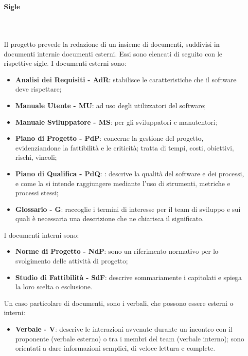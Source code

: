 		\paragraph{Sigle} \mbox{}\\ \mbox{}\\
		Il progetto prevede la redazione di un insieme di documenti, suddivisi in documenti interni\glosp e documenti esterni\glo. Essi sono elencati di seguito con le rispettive sigle.\newline
		I documenti esterni sono:	
		\begin{itemize}
			\item \textbf{Analisi dei Requisiti - AdR}: stabilisce le caratteristiche che il software deve rispettare;
			\item \textbf{Manuale Utente - MU}: ad uso degli utilizzatori del software;
			\item \textbf{Manuale Sviluppatore - MS}: per gli sviluppatori e manutentori;
			\item \textbf{Piano di Progetto - PdP}:  concerne la gestione del progetto, evidenziandone la fattibilità e le criticità; tratta di tempi, costi, obiettivi, rischi, vincoli;
			\item \textbf{Piano di Qualifica - PdQ}: : descrive la qualità del software e dei processi, e come la si intende raggiungere mediante l'uso di strumenti, metriche e processi stessi;
			\item \textbf{Glossario - G}: raccoglie i termini di interesse per il team di sviluppo e sui quali è necessaria una descrizione che ne chiarisca il significato.
		\end{itemize}
		I documenti interni sono:
		\begin{itemize}
			
			\item \textbf{Norme di Progetto - NdP}: sono un riferimento normativo per lo svolgimento delle attività di progetto;
			\item \textbf{Studio di Fattibilità - SdF}: descrive sommariamente i capitolati e spiega la loro scelta o esclusione.
		\end{itemize}
		Un caso particolare di documenti, sono i verbali, che possono essere esterni o interni:
		\begin{itemize}
			\item \textbf{Verbale - V}: descrive le interazioni avvenute durante un incontro con il proponente (verbale esterno) o tra i membri del team (verbale interno); sono orientati a dare informazioni semplici, di veloce lettura e complete.
		\end{itemize}

